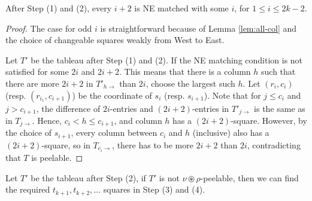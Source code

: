 \documentclass[ALCO,Unicode]{cedram}
\begin{document}
    \begin{lemma}\label{lem:step12-good}
        After Step (1) and (2), every $i+2$ is NE matched with some $i$, for $1\leq i \leq 2k-2$.
    \end{lemma}

    \begin{proof}
        The case for odd $i$ is straightforward because of Lemma \ref{lem:all-col} and the choice of changeable squares weakly from West to East.

        Let $T'$ be the tableau after Step (1) and (2). If the NE matching condition is not satisfied for some $2i$ and $2i+2$. This means that there is a column $h$ such that there are more $2i+2$ in $T'_{h\rightarrow}$ than $2i$, choose the largest such $h$. Let $(r_i,c_i)$ (resp. $(r_{i_1},c_{i+1})$) be the coordinate of $s_i$ (resp. $s_{i+1}$). Note that for $j \leq c_i$ and $j > c_{i+1}$, the difference of $2i$-entries and $(2i+2)$-entries in $T'_{j\rightarrow}$ is the same as in $T_{j\rightarrow}$. Hence, $c_{i} < h \leq c_{i+1}$, and column $h$ has a $(2i+2)$-square. However, by the choice of $s_{i+1}$, every column between $c_i$ and $h$ (inclusive) also has a $(2i+2)$-square, so in $T_{c_i\rightarrow}$, there has to be more $2i+2$ than $2i$, contradicting that $T$ is peelable.
    \end{proof}

    \begin{lemma}\label{lem:step34}
        Let $T'$ be the tableau after Step (2), if $T'$ is not $\nu\circledast\rho$-peelable, then we can find the required $t_{k+1}, t_{k+2},\ldots$ squares in Step (3) and (4).
    \end{lemma}
\end{document}

